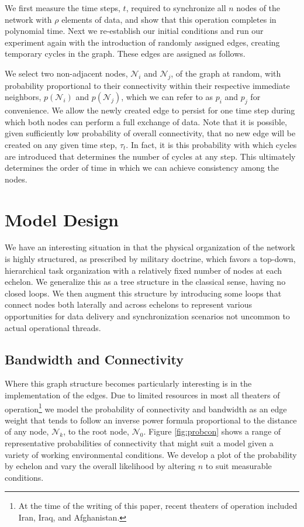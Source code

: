 \documentclass[10pt]{./IEEEtran}
\begin{document}
We first measure the time steps, $t$, required to synchronize all $n$ nodes of the network with $\rho$ elements of data, and show that this operation completes in polynomial time.  Next we re-establish our initial conditions and run our experiment again with the introduction of randomly assigned edges, creating temporary cycles in the graph.  These edges are assigned as follows.

We select two non-adjacent nodes, $\mathscr{N}_{i}$ and $\mathscr{N}_{j}$, of the graph at random, with probability proportional to their connectivity within their respective immediate neighbors, $p(\mathscr{N}_{i})$ and $p(\mathscr{N}_{j})$, which we can refer to as $p_{i}$ and $p_{j}$ for convenience.  We allow the newly created edge to persist for one time step during which both nodes can perform a full exchange of data.  Note that it is possible, given sufficiently low probability of overall connectivity, that no new edge will be created on any given time step, $\tau_{t}$.  In fact, it is this probability with which cycles are introduced that determines the number of cycles at any step.  This ultimately determines the order of time in which we can achieve consistency among the nodes.


\section{Model Design}
\label{sec:model}
We have an interesting situation in that the physical organization of the network is highly structured, as prescribed by military doctrine, which favors a top-down, hierarchical task organization with a relatively fixed number of nodes at each echelon.  We generalize this as a tree structure in the classical sense, having no closed loops.  We then augment this structure by introducing some loops that connect nodes both laterally and across echelons to represent various opportunities for data delivery and synchronization scenarios not uncommon to actual operational threads.

\subsection{Bandwidth and Connectivity}

Where this graph structure becomes particularly interesting is in the implementation of the edges.  Due to limited resources in most all theaters of operation\footnote{At the time of the writing of this paper, recent theaters of operation included Iran, Iraq, and Afghanistan.} we model the probability of connectivity and bandwidth as an edge weight that tends to follow an inverse power formula proportional to the distance of any node, $\mathscr{N}_{k}$, to the root node, $\mathscr{N}_{0}$.  Figure \ref{fig:probcon} shows a range of representative probabilities of connectivity that might suit a model given a variety of working environmental conditions.  We develop a plot of the probability by echelon and vary the overall likelihood by altering $n$ to suit measurable conditions.
\end{document}

